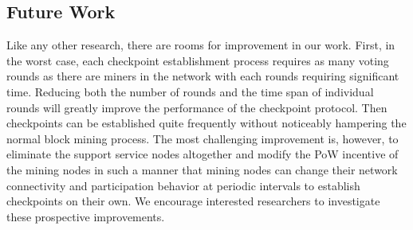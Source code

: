 \documentclass[conference]{IEEEtran}
\begin{document}
\subsection{Future Work}
Like any other research, there are rooms for improvement in our work. First, in the worst case, each checkpoint establishment process requires as many voting rounds as there are miners in the network with each rounds requiring significant time. Reducing both the number of rounds and the time span of individual rounds will greatly improve the performance of the checkpoint protocol. Then checkpoints can be established quite frequently without noticeably hampering the normal block mining process. The most challenging improvement is, however, to eliminate the support service nodes altogether and modify the PoW incentive of the mining nodes in such a manner that mining nodes can change their network connectivity and participation behavior at periodic intervals to establish checkpoints on their own. We encourage interested researchers to investigate these prospective improvements.          
   
 


\end{document}
